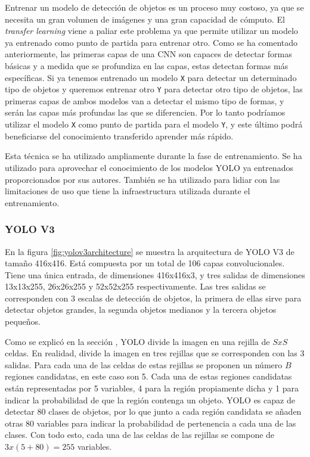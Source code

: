 
Entrenar un modelo de detección de objetos es un proceso muy costoso, ya que se necesita un gran volumen de imágenes y una gran capacidad de cómputo. El \textit{transfer learning} \cite{s5_transfer_learning} viene a paliar este problema ya que permite utilizar un modelo ya entrenado como punto de partida para entrenar otro. Como se ha comentado anteriormente, las primeras capas de una CNN son capaces de detectar formas básicas y a medida que se profundiza en las capas, estas detectan formas más específicas. Si ya tenemos entrenado un modelo \texttt{X} para detectar un determinado tipo de objetos y queremos entrenar otro \texttt{Y} para detectar otro tipo de objetos, las primeras capas de ambos modelos van a detectar el mismo tipo de formas, y serán las capas más profundas las que se diferencien. Por lo tanto podríamos utilizar el modelo \texttt{X} como punto de partida para el modelo \texttt{Y}, y este último podrá beneficiarse del conocimiento transferido aprender más rápido.

Esta técnica se ha utilizado ampliamente durante la fase de entrenamiento. Se ha utilizado para aprovechar el conocimiento de los modelos YOLO ya entrenados proporcionados por sus autores. También se ha utilizado para lidiar con las limitaciones de uso que tiene la infraestructura utilizada durante el entrenamiento.

\subsubsection*{YOLO V3}

En la figura \ref{fig:yolov3architecture} se muestra la arquitectura de YOLO V3 de tamaño 416x416. Está compuesta por un total de 106 capas convolucionales. Tiene una única entrada, de dimensiones 416x416x3, y tres salidas de dimensiones 13x13x255, 26x26x255 y 52x52x255 respectivamente. Las tres salidas se corresponden con 3 escalas de detección de objetos, la primera de ellas sirve para detectar objetos grandes, la segunda objetos medianos y la tercera objetos pequeños.

Como se explicó en la sección \textit{}, YOLO divide la imagen en una rejilla de $SxS$ celdas. En realidad, divide la imagen en tres rejillas que se corresponden con las 3 salidas. Para cada una de las celdas de estas rejillas se proponen un número $B$ regiones candidatas, en este caso son 5. Cada una de estas regiones candidatas están representadas por 5 variables, 4 para la región propiamente dicha y 1 para indicar la probabilidad de que la región contenga un objeto. YOLO es capaz de detectar 80 clases de objetos, por lo que junto a cada región candidata se añaden otras 80 variables para indicar la probabilidad de pertenencia a cada una de las clases. Con todo esto, cada una de las celdas de las rejillas se compone de $3 x (5 + 80) = 255$ variables.

